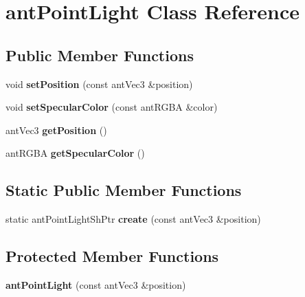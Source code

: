 \hypertarget{classant_point_light}{\section{ant\+Point\+Light Class Reference}
\label{classant_point_light}
}
\subsection*{Public Member Functions}
\begin{DoxyCompactItemize}
\item 
\hypertarget{classant_point_light_a630a91019ee07f405b1afe7d2449bc53}{void {\bfseries set\+Position} (const ant\+Vec3 \&position)}\label{classant_point_light_a630a91019ee07f405b1afe7d2449bc53}

\item 
\hypertarget{classant_point_light_a8c51da56f08f230a417f2a867c3a0ff6}{void {\bfseries set\+Specular\+Color} (const ant\+R\+G\+B\+A \&color)}\label{classant_point_light_a8c51da56f08f230a417f2a867c3a0ff6}

\item 
\hypertarget{classant_point_light_ae1ed38562f6907d0d0a0923ca0388b4d}{ant\+Vec3 {\bfseries get\+Position} ()}\label{classant_point_light_ae1ed38562f6907d0d0a0923ca0388b4d}

\item 
\hypertarget{classant_point_light_abf843442d58947a608394a1438514c90}{ant\+R\+G\+B\+A {\bfseries get\+Specular\+Color} ()}\label{classant_point_light_abf843442d58947a608394a1438514c90}

\end{DoxyCompactItemize}
\subsection*{Static Public Member Functions}
\begin{DoxyCompactItemize}
\item 
\hypertarget{classant_point_light_a49c685f4d26ff6a6b5e2ae0452a3a695}{static ant\+Point\+Light\+Sh\+Ptr {\bfseries create} (const ant\+Vec3 \&position)}\label{classant_point_light_a49c685f4d26ff6a6b5e2ae0452a3a695}

\end{DoxyCompactItemize}
\subsection*{Protected Member Functions}
\begin{DoxyCompactItemize}
\item 
\hypertarget{classant_point_light_a7fdb42a6d2d32e34dc3a5404a2732c66}{{\bfseries ant\+Point\+Light} (const ant\+Vec3 \&position)}\label{classant_point_light_a7fdb42a6d2d32e34dc3a5404a2732c66}

\end{DoxyCompactItemize}
